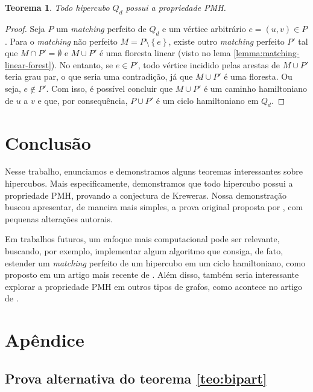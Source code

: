 \documentclass[12pt, a4paper]{article}
\newtheorem{theorem}{Teorema}[section]
\begin{document}
\begin{theorem}
    Todo hipercubo $Q_d$ possui a propriedade PMH.
\end{theorem}

\begin{proof}
    Seja $P$ um \textit{matching} perfeito de $Q_d$ e um vértice arbitrário $e = (u, v) \in P$. Para o \textit{matching} não perfeito $M = P \setminus \left\{ e \right\}$, existe outro \textit{matching} perfeito $P'$ tal que $M \cap P' = \emptyset$ e $M \cup P'$ é uma floresta linear (visto no lema \ref{lemma:matching-linear-forest}). No entanto, se $e \in P'$, todo vértice incidido pelas arestas de $M \cup P'$ teria grau par, o que seria uma contradição, já que $M \cup P'$ é uma floresta. Ou seja, $e \not\in P'$. Com isso, é possível concluir que $M \cup P'$ é um caminho hamiltoniano de $u$ a $v$ e que, por consequência, $P \cup P'$ é um ciclo hamiltoniano em $Q_d$.
\end{proof}

\section{Conclusão}

Nesse trabalho, enunciamos e demonstramos alguns teoremas interessantes sobre hipercubos. Mais especificamente, demonstramos que todo hipercubo possui a propriedade PMH, provando a conjectura de Kreweras. Nossa demonstração buscou apresentar, de maneira mais simples, a prova original proposta por \citet{fink_perfect_2007}, com pequenas alterações autorais. 

Em trabalhos futuros, um enfoque mais computacional pode ser relevante, buscando, por exemplo, implementar algum algoritmo que consiga, de fato, estender um \textit{matching} perfeito de um hipercubo em um ciclo hamiltoniano, como proposto em um artigo mais recente de \citet{fink_two_2020}. Além disso, também seria interessante explorar a propriedade PMH em outros tipos de grafos, como acontece no artigo de \citet{abreu_perfect_2022}.




\newpage

\appendix
\section{Apêndice}

\subsection{Prova alternativa do teorema \ref{teo:bipart}}\label{ap:prova_teo}
\end{document}

